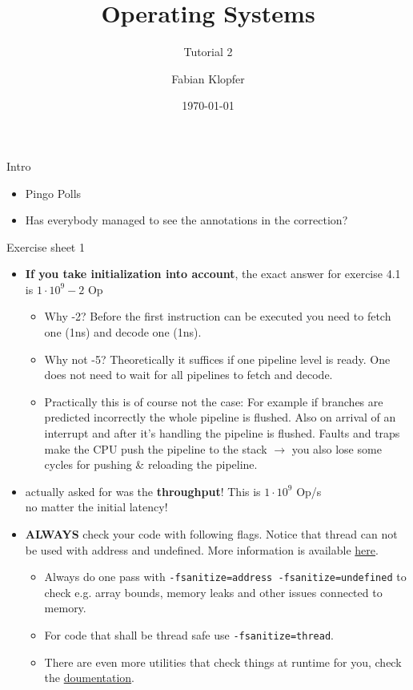 \documentclass[10pt]{beamer}
\title{\textbf{Operating Systems}}
\subtitle{Tutorial 2}
\author{Fabian Klopfer}
\date{\today}
\begin{document}
\frame{\titlepage}


\begin{frame}{Intro}
\begin{itemize}
 \item Pingo Polls
 \item Has everybody managed to see the annotations in the correction?
\end{itemize}
\end{frame}

\begin{frame}[allowframebreaks]{Exercise sheet 1}
\begin{itemize}
 \item \textbf{If you take initialization into account}, the  exact answer for exercise 4.1 is $1 \cdot 10^9 -2$ Op \\
 \begin{itemize}
  \item Why -2? Before the first instruction can be executed you need to fetch one (1ns) and decode one (1ns). 
  \item Why not -5? Theoretically it suffices if one pipeline level is ready. One does not need to wait for all pipelines to fetch and decode.
  \item Practically this is of course not the case: For example if branches are predicted incorrectly the whole pipeline is flushed. Also on arrival of an interrupt and after it's handling the pipeline is flushed. Faults and traps make the CPU push the pipeline to the stack $\rightarrow$ you also lose some cycles for pushing \& reloading the pipeline.
 \end{itemize}
 \item actually asked for was the \textbf{throughput}! This is $1 \cdot 10^9$ Op/s\\ no matter the initial latency!
 
 \framebreak
\item \textbf{ALWAYS} check your code with following flags. Notice that thread can not be used with address and undefined. More information is available \href{https://gcc.gnu.org/onlinedocs/gcc/Instrumentation-Options.html}{here}.
\begin{itemize}
 \item Always do one pass with \texttt{-fsanitize=address -fsanitize=undefined} to check e.g. array bounds, memory leaks and other issues connected to memory.
 \item For code that shall be thread safe use \texttt{-fsanitize=thread}.
 \item There are even more utilities that check things at runtime for you, check the  \href{https://gcc.gnu.org/onlinedocs/gcc/Instrumentation-Options.html}{doumentation}.
\end{itemize}

\end{itemize}
\end{frame}
\end{document}
